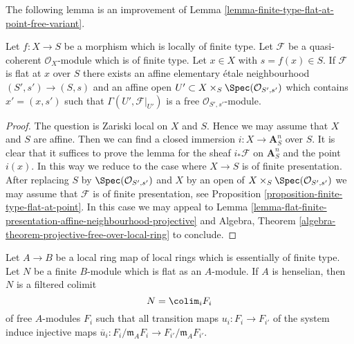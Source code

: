 \noindent
The following lemma is an improvement of
Lemma \ref{lemma-finite-type-flat-at-point-free-variant}.

\begin{lemma}
\label{lemma-flat-finite-type-affine-neighbourhood-projective}
Let $f : X \to S$ be a morphism which is locally of finite type.
Let $\mathcal{F}$ be a quasi-coherent $\mathcal{O}_X$-module which is
of finite type. Let $x \in X$ with $s = f(x) \in S$.
If $\mathcal{F}$ is flat at $x$ over $S$ there exists an affine
elementary \'etale neighbourhood $(S', s') \to (S, s)$ and
an affine open $U' \subset X \times_S \Spec(\mathcal{O}_{S', s'})$
which contains $x' = (x, s')$ such that
$\Gamma(U', \mathcal{F}|_{U'})$ is a free
$\mathcal{O}_{S', s'}$-module.
\end{lemma}

\begin{proof}
The question is Zariski local on $X$ and $S$. Hence we may assume
that $X$ and $S$ are affine. Then we can find a closed immersion
$i : X \to \mathbf{A}^n_S$ over $S$. It is clear that it suffices to
prove the lemma for the sheaf $i_*\mathcal{F}$ on $\mathbf{A}^n_S$
and the point $i(x)$. In this way we reduce to the case where $X \to S$ is
of finite presentation. After replacing $S$ by
$\Spec(\mathcal{O}_{S', s'})$ and $X$ by an open of
$X \times_S \Spec(\mathcal{O}_{S', s'})$ we may assume that
$\mathcal{F}$ is of finite presentation, see
Proposition \ref{proposition-finite-type-flat-at-point}.
In this case we may appeal to
Lemma \ref{lemma-flat-finite-presentation-affine-neighbourhood-projective}
and
Algebra, Theorem \ref{algebra-theorem-projective-free-over-local-ring}
to conclude.
\end{proof}

\begin{lemma}
\label{lemma-flat-finite-type-local-colimit-free}
Let $A \to B$ be a local ring map of local rings which is essentially of
finite type. Let $N$ be a finite $B$-module which is flat as an $A$-module.
If $A$ is henselian, then $N$ is a filtered colimit
$$
N = \colim_i F_i
$$
of free $A$-modules $F_i$ such that all transition maps
$u_i : F_i \to F_{i'}$ of the system induce injective maps
$\overline{u}_i : F_i/\mathfrak m_AF_i \to F_{i'}/\mathfrak m_AF_{i'}$.
\end{lemma}

